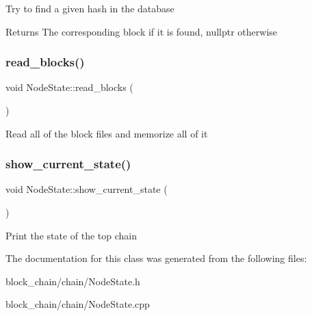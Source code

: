 Try to find a given hash in the database

\begin{DoxyReturn}{Returns}
The corresponding block if it is found, nullptr otherwise 
\end{DoxyReturn}
\mbox{\label{classNodeState_ae2e3a8a54ab5276bf469af2cf2107f2b}} 
\subsubsection{\texorpdfstring{read\+\_\+blocks()}{read\_blocks()}}
{\footnotesize\ttfamily void Node\+State\+::read\+\_\+blocks (\begin{DoxyParamCaption}{ }\end{DoxyParamCaption})}

Read all of the block files and memorize all of it \mbox{\label{classNodeState_aedd8b10b2ca3f51e5c95b7ebed70464c}} 
\subsubsection{\texorpdfstring{show\+\_\+current\+\_\+state()}{show\_current\_state()}}
{\footnotesize\ttfamily void Node\+State\+::show\+\_\+current\+\_\+state (\begin{DoxyParamCaption}{ }\end{DoxyParamCaption})}

Print the state of the top chain 

The documentation for this class was generated from the following files\+:\begin{DoxyCompactItemize}
\item 
block\+\_\+chain/chain/Node\+State.\+h\item 
block\+\_\+chain/chain/Node\+State.\+cpp\end{DoxyCompactItemize}
